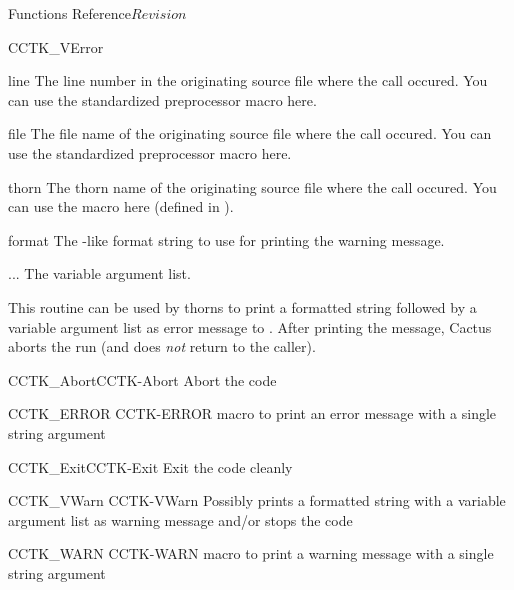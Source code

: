 \begin{cactuspart}{ Functions Reference}{}{$Revision$}
\begin{FunctionDescription}{CCTK\_VError}
\begin{ParameterSection}
\begin{Parameter}{line}
The line number in the originating source file where the  call
occured. You can use the standardized  preprocessor macro here.
\end{Parameter}
\begin{Parameter}{file}
The file name of the originating source file where the  call
occured. You can use the standardized  preprocessor macro here.
\end{Parameter}
\begin{Parameter}{thorn}
The thorn name of the originating source file where the  call occured. You can use the  macro here (defined in ).
\end{Parameter}
\begin{Parameter}{format}
The -like format string to use for printing the warning message.
\end{Parameter}
\begin{Parameter}{...}
The variable argument list.
\end{Parameter}
\end{ParameterSection}

\begin{Discussion}
This routine can be used by thorns to print a formatted string
followed by a variable argument list as error message to
. After printing the message, Cactus aborts the run (and
 does \emph{not} return to the caller).
\end{Discussion}

\begin{SeeAlsoSection}
\begin{SeeAlso2}{CCTK\_Abort}{CCTK-Abort}
Abort the code
\end{SeeAlso2}
\begin{SeeAlso2} {CCTK\_ERROR} {CCTK-ERROR}
macro to print an error message with a single string argument
\end{SeeAlso2}
\begin{SeeAlso2}{CCTK\_Exit}{CCTK-Exit}
Exit the code cleanly
\end{SeeAlso2}
\begin{SeeAlso2} {CCTK\_VWarn} {CCTK-VWarn}
Possibly prints a formatted string with a variable argument list as
warning message and/or stops the code
\end{SeeAlso2}
\begin{SeeAlso2} {CCTK\_WARN} {CCTK-WARN}
macro to print a warning message with a single string argument
\end{SeeAlso2}
\end{SeeAlsoSection}


\end{FunctionDescription}
\end{cactuspart}

